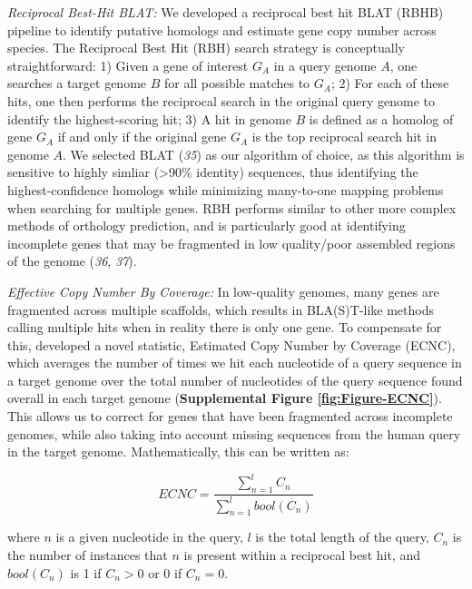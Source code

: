 \documentclass[]{elsarticle} %
\begin{document}
\emph{Reciprocal Best-Hit BLAT:} We developed a reciprocal best hit BLAT (RBHB) pipeline to identify putative homologs and estimate gene copy number across species. The Reciprocal Best Hit (RBH) search strategy is conceptually straightforward: 1) Given a gene of interest \(G_A\) in a query genome \(A\), one searches a target genome \(B\) for all possible matches to \(G_A\); 2) For each of these hits, one then performs the reciprocal search in the original query genome to identify the highest-scoring hit; 3) A hit in genome \(B\) is defined as a homolog of gene \(G_A\) if and only if the original gene \(G_A\) is the top reciprocal search hit in genome \(A\). We selected BLAT (\emph{35}) as our algorithm of choice, as this algorithm is sensitive to highly simliar (\textgreater90\% identity) sequences, thus identifying the highest-confidence homologs while minimizing many-to-one mapping problems when searching for multiple genes. RBH performs similar to other more complex methods of orthology prediction, and is particularly good at identifying incomplete genes that may be fragmented in low quality/poor assembled regions of the genome (\emph{36}, \emph{37}).

\emph{Effective Copy Number By Coverage:} In low-quality genomes, many genes are fragmented across multiple scaffolds, which results in BLA(S)T-like methods calling multiple hits when in reality there is only one gene. To compensate for this, developed a novel statistic, Estimated Copy Number by Coverage (ECNC), which averages the number of times we hit each nucleotide of a query sequence in a target genome over the total number of nucleotides of the query sequence found overall in each target genome (\textbf{Supplemental Figure \ref{fig:Figure-ECNC}}). This allows us to correct for genes that have been fragmented across incomplete genomes, while also taking into account missing sequences from the human query in the target genome. Mathematically, this can be written as:

\[ ECNC = \frac{\sum_{n=1}^{l} C_n}{\sum_{n=1}^{l} bool(C_n)}\]

where \(n\) is a given nucleotide in the query, \(l\) is the total length of the query, \(C_n\) is the number of instances that \(n\) is present within a reciprocal best hit, and \(bool(C_n)\) is 1 if \(C_n > 0\) or 0 if \(C_n = 0\).
\end{document}
